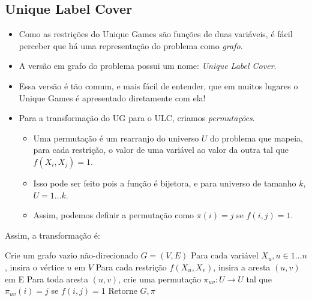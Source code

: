 \documentclass[12pt,a4paper]{article}
\begin{document}
\subsection{Unique Label Cover}

\begin{itemize}
    \item Como as restrições do Unique Games são funções de duas variáveis, é fácil perceber que há uma representação do problema como \emph{grafo}.
    \item A versão em grafo do problema possui um nome: \emph{Unique Label Cover}.
    \item Essa versão é tão comum, e mais fácil de entender, que em muitos lugares o Unique Games é apresentado diretamente com ela!
    \item Para a transformação do UG para o ULC, criamos \emph{permutações}.
    \begin{itemize}
        \item Uma permutação é um rearranjo do universo $U$ do problema que mapeia, para cada restrição, o valor de uma variável ao valor da outra tal que $f(X_i,X_j) = 1$.
        \item Isso pode ser feito pois a função é bijetora, e para universo de tamanho $k$, $U={1\dots k}$.
        \item Assim, podemos definir a permutação como $\pi(i) = j$ se $f(i,j) = 1$.
    \end{itemize}
\end{itemize}

Assim, a transformação é:

\begin{algorithm}
  Crie um grafo vazio não-direcionado $G=(V,E)$\;
  Para cada variável $X_u, u \in {1\dots n}$, insira o vértice $u$ em $V$\;
  Para cada restrição $f(X_u,X_v)$, insira a aresta $(u,v)$ em E\;
  Para toda aresta $(u,v)$, crie uma permutação $\pi_{uv}: U \xrightarrow{} U$ tal que $\pi_{uv}(i)=j$ se $f(i,j)=1$\;
  Retorne $G, \pi$\;
\end{algorithm}
\end{document}
